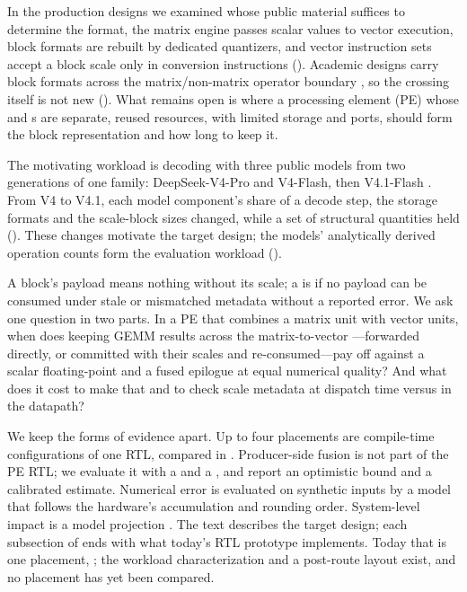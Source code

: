 %
In the production designs we examined whose public material suffices to determine the \handoff format, the matrix engine passes scalar values to vector execution, block formats are rebuilt by dedicated quantizers, and vector instruction sets accept a block scale only in conversion instructions ().
Academic designs carry block formats across the matrix/non-matrix operator boundary \cite{Wang2025DBAttn}  , so the crossing itself is not new ().
What remains open is where a processing element (PE) whose \TensorUnit and \VectorCore{}s are separate, reused resources, with limited storage and ports, should form the block representation and how long to keep it.

%
The motivating workload is decoding with three public models from two generations of one family: DeepSeek-V4-Pro and V4-Flash, then V4.1-Flash \cite{DeepSeekAI2026V4ProHF,DeepSeekAI2026V41Flash,DeepSeekAI2026V41FlashHF}  .
From V4 to V4.1, each model component's share of a decode step, the storage formats and the scale-block sizes changed, while a set of structural quantities held ().
These changes motivate the target design; the models' analytically derived operation counts form the evaluation workload ().

%
A block's payload means nothing without its scale; a \handoff is \failvisible if no payload can be consumed under stale or mismatched metadata without a reported error.
We ask one question in two parts.
In a PE that combines a matrix unit with vector units, when does keeping GEMM results \blockscaled across the matrix-to-vector \handoff{}---forwarded directly, or committed with their scales and re-consumed---pay off against a scalar floating-point \handoff and a fused epilogue at equal numerical quality?
And what does it cost to make that \handoff \failvisible and to check scale metadata at dispatch time versus in the datapath? 

%
We keep the forms of evidence apart.
Up to four \handoff placements are compile-time configurations of one RTL, compared in \evRTL.
Producer-side fusion is not part of the PE RTL; we evaluate it with a \evSlice and a \evModel, and report an optimistic bound and a calibrated estimate.
Numerical error is evaluated on synthetic inputs by a model that follows the hardware's accumulation and rounding order.
System-level impact is a model projection .
The text describes the target design; each subsection of  ends with what today's RTL prototype implements.
Today that is one placement, \armBD; the workload characterization and a post-route layout exist, and no placement has yet been compared.

